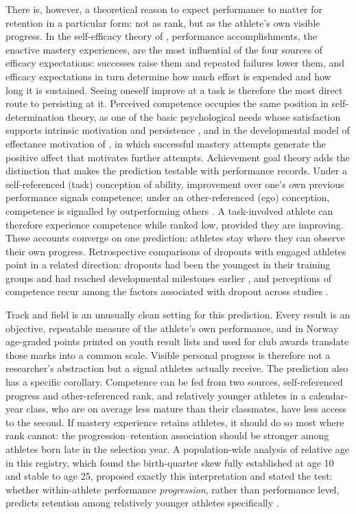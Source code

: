 \documentclass[12pt,a4paper]{article}
\begin{document}
There is, however, a theoretical reason to expect performance to matter for retention in a particular form: not as rank, but as the athlete's own visible progress. In the self-efficacy theory of \citet{bandura1977}, performance accomplishments, the enactive mastery experiences, are the most influential of the four sources of efficacy expectations: successes raise them and repeated failures lower them, and efficacy expectations in turn determine how much effort is expended and how long it is sustained. Seeing oneself improve at a task is therefore the most direct route to persisting at it. Perceived competence occupies the same position in self-determination theory, as one of the basic psychological needs whose satisfaction supports intrinsic motivation and persistence \citep{ryan2000}, and in the developmental model of effectance motivation of \citet{harter1978}, in which successful mastery attempts generate the positive affect that motivates further attempts. Achievement goal theory adds the distinction that makes the prediction testable with performance records. Under a self-referenced (task) conception of ability, improvement over one's own previous performance signals competence; under an other-referenced (ego) conception, competence is signalled by outperforming others \citep{nicholls1984}. A task-involved athlete can therefore experience competence while ranked low, provided they are improving. These accounts converge on one prediction: athletes stay where they can observe their own progress. Retrospective comparisons of dropouts with engaged athletes point in a related direction: dropouts had been the youngest in their training groups and had reached developmental milestones earlier \citep{fraserthomas2008}, and perceptions of competence recur among the factors associated with dropout across studies \citep{crane2015}.

Track and field is an unusually clean setting for this prediction. Every result is an objective, repeatable measure of the athlete's own performance, and in Norway age-graded points printed on youth result lists and used for club awards translate those marks into a common scale. Visible personal progress is therefore not a researcher's abstraction but a signal athletes actually receive. The prediction also has a specific corollary. Competence can be fed from two sources, self-referenced progress and other-referenced rank, and relatively younger athletes in a calendar-year class, who are on average less mature than their classmates, have less access to the second. If mastery experience retains athletes, it should do so most where rank cannot: the progression--retention association should be stronger among athletes born late in the selection year. A population-wide analysis of relative age in this registry, which found the birth-quarter skew fully established at age 10 and stable to age 25, proposed exactly this interpretation and stated the test: whether within-athlete performance \emph{progression}, rather than performance level, predicts retention among relatively younger athletes specifically \citep{guttormsen2026rae}.
\end{document}
